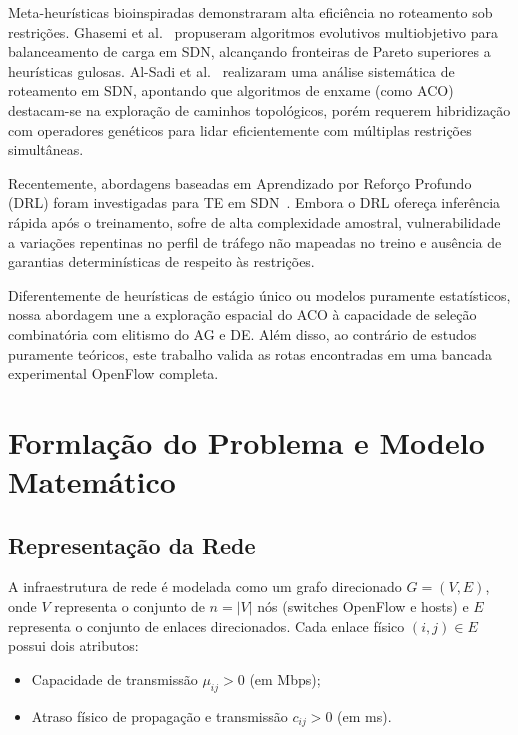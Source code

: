 \documentclass[journal]{IEEEtran}
\begin{document}
Meta-heur\'{i}sticas bioinspiradas demonstraram alta efici\^{e}ncia no roteamento sob restri\c{c}\~{o}es. Ghasemi et al.~\cite{ghasemi2022multi} propuseram algoritmos evolutivos multiobjetivo para balanceamento de carga em SDN, alcan\c{c}ando fronteiras de Pareto superiores a heur\'{i}sticas gulosas. Al-Sadi et al.~\cite{alsadi2021qos} realizaram uma an\'{a}lise sistem\'{a}tica de roteamento em SDN, apontando que algoritmos de enxame (como ACO) destacam-se na explora\c{c}\~{a}o de caminhos topol\'{o}gicos, por\'{e}m requerem hibridiza\c{c}\~{a}o com operadores gen\'{e}ticos para lidar eficientemente com m\'{u}ltiplas restri\c{c}\~{o}es simult\^{a}neas.

Recentemente, abordagens baseadas em Aprendizado por Refor\c{c}o Profundo (DRL) foram investigadas para TE em SDN~\cite{ayoubi2018machine, boutaba2018comprehensive, xie2023drl}. Embora o DRL ofere\c{c}a infer\^{e}ncia r\'{a}pida ap\'{o}s o treinamento, sofre de alta complexidade amostral, vulnerabilidade a varia\c{c}\~{o}es repentinas no perfil de tr\'{a}fego n\~{a}o mapeadas no treino e aus\^{e}ncia de garantias determin\'{i}sticas de respeito \`{a}s restri\c{c}\~{o}es. 

Diferentemente de heur\'{i}sticas de est\'{a}gio \'{u}nico ou modelos puramente estat\'{i}sticos, nossa abordagem une a explora\c{c}\~{a}o espacial do ACO \`{a} capacidade de sele\c{c}\~{a}o combinat\'{o}ria com elitismo do AG e DE. Al\'{e}m disso, ao contr\'{a}rio de estudos puramente te\'{o}ricos, este trabalho valida as rotas encontradas em uma bancada experimental OpenFlow completa.

\section{Formla\c{c}\~{a}o do Problema e Modelo Matem\'{a}tico}
\label{sec:modelo}

\subsection{Representa\c{c}\~{a}o da Rede}
A infraestrutura de rede \'{e} modelada como um grafo direcionado $G = (V, E)$, onde $V$ representa o conjunto de $n = |V|$ n\'{o}s (switches OpenFlow e hosts) e $E$ representa o conjunto de enlaces direcionados. Cada enlace f\'{i}sico $(i, j) \in E$ possui dois atributos:
\begin{itemize}
    \item Capacidade de transmiss\~{a}o $\mu_{ij} > 0$ (em Mbps);
    \item Atraso f\'{i}sico de propaga\c{c}\~{a}o e transmiss\~{a}o $c_{ij} > 0$ (em ms).
\end{itemize}
\end{document}
